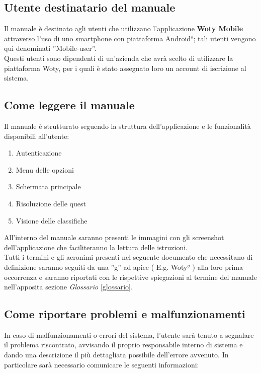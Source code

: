 	\subsection{Utente destinatario del manuale}
Il manuale è destinato agli utenti che utilizzano l'applicazione \textbf{Woty Mobile} attraverso l'uso di uno smartphone con piattaforma Android$^s$; tali utenti vengono qui denominati ''Mobile-user''.\\
Questi utenti sono dipendenti di un'azienda che avrà scelto di utilizzare la piattaforma Woty, per i quali è stato assegnato loro un account di iscrizione al sistema.




\subsection{Come leggere il manuale}
Il manuale è strutturato seguendo la struttura dell'applicazione e le funzionalità disponibili all'utente:
	
\begin{enumerate}
	\item Autenticazione
	\item Menu delle opzioni
	\item Schermata principale
	\item Risoluzione delle quest
	\item Visione delle classifiche
\end{enumerate}

	All'interno del manuale saranno presenti le immagini con gli screenshot dell'applicazione che faciliteranno la lettura delle istruzioni.\\



Tutti i termini e gli acronimi presenti nel seguente documento che necessitano di definizione saranno seguiti da una ''g'' ad apice ( E.g. Woty$^g$ ) alla loro prima occorrenza e saranno riportati con le rispettive spiegazioni al termine del manuale nell'apposita sezione \emph{Glossario} \ref{glossario}.



\subsection{Come riportare problemi e malfunzionamenti}
\label{assistenza}
In caso di malfunzionamenti o errori del sistema, l'utente sarà tenuto a segnalare il problema riscontrato, avvisando il proprio responsabile interno di sistema e dando una descrizione il più dettagliata possibile dell'errore avvenuto.
In particolare sarà necessario comunicare le seguenti informazioni:

